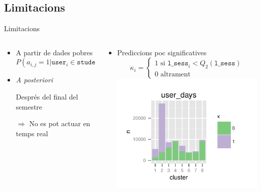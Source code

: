 \documentclass[xcolor=x11names,
								compress,
								aspectratio=1610]{beamer}
\newcommand{\mt}[1]{\texttt{#1}}
\theoremstyle{definition}%
\renewcommand{\(}{\begin{columns}}
\renewcommand{\)}{\end{columns}}
\newcommand{\<}[1]{\begin{column}{#1}}
\renewcommand{\>}{\end{column}}
\begin{document}
\subsection{Limitacions}
\begin{frame}{Limitacions}
	\begin{columns}[onlytextwidth]
		\begin{column}{.5\textwidth}
			\begin{itemize}
			\item A partir de dades pobres
				$$
				P(a_{i,j}=1|\mt{user}_i \in \mt{students}) \quad ?
				$$
			\vspace{1cm}
			\item \emph{A posteriori}
				
				Després del final del semestre
				
				$\Rightarrow$ No es pot actuar en temps real

			\end{itemize}
		\end{column}
		\begin{column}{.5\textwidth}
			\begin{itemize}
			\item Prediccions poc significatives
			$$
				\kappa_i = \begin{cases}
						1 \text{ si } \mt{l\_sess}_i < Q_2(\mt{l\_sess}) \\
						0 \text{ altrament} 
					\end{cases} 
			$$
			\includegraphics{user_presence_pred8means_clusts}	
			\end{itemize}
		\end{column}
	\end{columns}
	
\end{frame}
\end{document}
